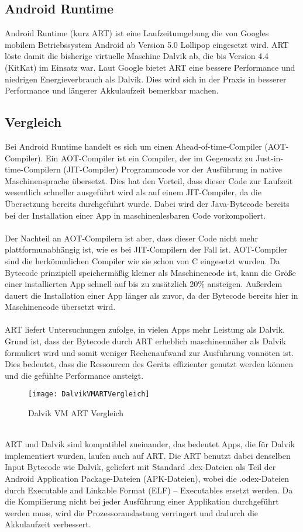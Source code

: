 \documentclass[11pt,conference,a4paper]{IEEEtran}
\begin{document}
\subsection{Android Runtime\cite{4}}
Android Runtime (kurz ART) ist eine Laufzeitumgebung die von Googles mobilem Betriebssystem Android ab Version 5.0 Lollipop eingesetzt wird.
ART löste damit die bisherige virtuelle Maschine Dalvik ab, die bis Version 4.4 (KitKat) im Einsatz war. Laut Google bietet ART eine bessere Performance und niedrigen Energieverbrauch als Dalvik. Dies wird sich in der Praxis in besserer Performance und längerer Akkulaufzeit bemerkbar machen.

\subsection{Vergleich\cite{9}}
Bei Android Runtime handelt es sich um einen Ahead-of-time-Compiler (AOT-Compiler). Ein AOT-Compiler ist ein Compiler, der im Gegensatz zu Just-in-time-Compilern (JIT-Compiler) Programmcode vor der Ausführung in native Maschinensprache übersetzt. Dies hat den Vorteil, dass dieser Code zur Laufzeit wesentlich schneller ausgeführt wird als auf einem JIT-Compiler, da die Übersetzung bereits durchgeführt wurde. Dabei wird der Java-Bytecode bereits bei der Installation einer App in maschinenlesbaren Code vorkompoliert. 
\\
\\
Der Nachteil an AOT-Compilern ist aber, dass dieser Code nicht mehr plattformunabhängig ist, wie es bei JIT-Compilern der Fall ist. AOT-Compiler sind die herkömmlichen Compiler wie sie schon von C eingesetzt wurden. Da Bytecode prinzipiell speichermäßig kleiner als Maschinencode ist, kann die Größe einer installierten App schnell auf bis zu zusätzlich 20\% ansteigen. Außerdem dauert die Installation einer App länger als zuvor, da der Bytecode bereits hier in Maschinencode übersetzt wird.
\\
\\
ART liefert Untersuchungen zufolge, in vielen Apps mehr Leistung als Dalvik. Grund ist, dass der Bytecode durch ART erheblich maschinennäher als Dalvik formuliert wird und somit weniger Rechenaufwand zur Ausführung vonnöten ist. Dies bedeutet, dass die Ressourcen des Geräts effizienter genutzt werden können und die gefühlte Performance ansteigt.
\\
\begin{figure*}
\centering
\texttt{[image: DalvikVMARTVergleich]}
\caption{Dalvik VM ART Vergleich\cite{10}}
\label{fig:DalvikVMARTVergleich}
\end{figure*}
\\
ART und Dalvik sind kompatiblel zueinander, das bedeutet Apps, die für Dalvik implementiert wurden, laufen auch auf ART. Die ART benutzt dabei denselben Input Bytecode wie Dalvik, geliefert mit Standard .dex-Dateien als Teil der Android Application Package-Dateien (APK-Dateien), wobei die .odex-Dateien durch Executable and Linkable Format (ELF) – Executables ersetzt werden. Da die Kompilierung nicht bei jeder Ausführung einer Applikation durchgeführt werden muss, wird die Prozessorauslastung verringert und dadurch die Akkulaufzeit verbessert.
\end{document}
